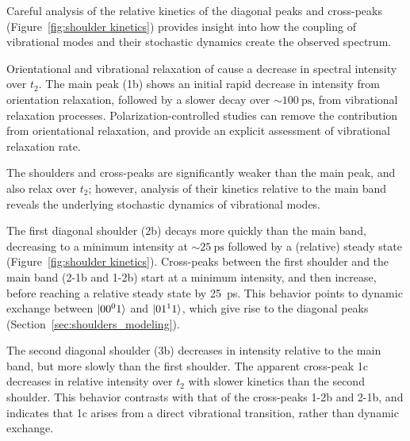\documentclass[%
  class = book,%
  crop = false,%
  float = true,%
  multi = true,%
  preview = false,%
]{standalone}
\begin{document}
{Careful analysis of the relative kinetics of the diagonal peaks and cross-peaks (Figure~\ref{fig:shoulder kinetics}) provides insight into how the coupling of  vibrational modes and their stochastic dynamics create the observed spectrum.

Orientational and vibrational relaxation of  cause a decrease in spectral intensity over \(t_2\). The main peak (1b) shows an initial rapid decrease in intensity from orientation relaxation, followed by a slower decay over \(\sim \SI{100}{\ps}\), from vibrational relaxation processes. Polarization-controlled studies can remove the contribution from orientational relaxation, and provide an explicit assessment of vibrational relaxation rate.\cite{hamm_concepts_2011,Hochstrasser2001}

The shoulders and cross-peaks are significantly weaker than the main peak, and also relax over \(t_2\); however, analysis of their kinetics relative to the main band reveals the underlying stochastic dynamics of  vibrational modes.

The first diagonal shoulder (2b) decays more quickly than the main band, decreasing to a minimum intensity at \(\sim \SI{25}{\ps}\) followed by a (relative) steady state (Figure~\ref{fig:shoulder kinetics}). Cross-peaks between the first shoulder and the main band (2-1b and 1-2b) start at a minimum intensity, and then increase, before reaching a relative steady state by \SI{25}{\ps}. This behavior points to dynamic exchange between \(\ket{00^01}\) and \(\ket{01^11}\), which give rise to the diagonal peaks (Section~\ref{sec:shoulders_modeling}).

The second diagonal shoulder (3b) decreases in intensity relative to the main band, but more slowly than the first shoulder. The apparent cross-peak 1c decreases in relative intensity over \(t_2\) with slower kinetics than the second shoulder. This behavior contrasts with that of the cross-peaks 1-2b and 2-1b, and indicates that 1c arises from a direct vibrational transition, rather than dynamic exchange.

}
\end{document}

